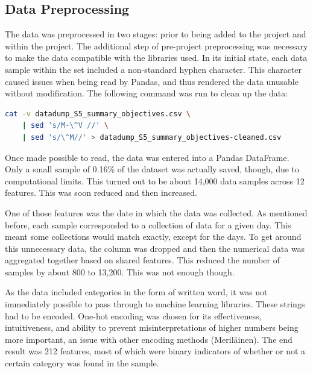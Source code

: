 \documentclass[12pt]{article}
\begin{document}
\newpage

\subsection{Data Preprocessing}
The data was preprocessed in two stages: prior to being added to the project and within the project.
The additional step of pre-project preprocessing was necessary to make the data compatible with the libraries used.
In its initial state, each data sample within the set included a non-standard hyphen character.
This character caused issues when being read by Pandas, and thus rendered the data unusable without modification.
The following command was run to clean up the data:
\begin{lstlisting}[language=Bash]
	cat -v datadump_S5_summary_objectives.csv \
	| sed 's/M-\^V //' \
	| sed 's/\^M//' > datadump_S5_summary_objectives-cleaned.csv
\end{lstlisting}

Once made possible to read, the data was entered into a Pandas DataFrame.
Only a small sample of 0.16\% of the dataset was actually saved, though, due to computational limits.
This turned out to be about 14,000 data samples across 12 features.
This was soon reduced and then increased.

One of those features was the date in which the data was collected.
As mentioned before, each sample corresponded to a collection of data for a given day.
This meant some collections would match exactly, except for the days.
To get around this unnecessary data, the column was dropped and then the numerical data was aggregated together based on shared features.
This reduced the number of samples by about 800 to 13,200.
This was not enough though.

As the data included categories in the form of written word, it was not immediately possible to pass through to machine learning libraries.
These strings had to be encoded.
One-hot encoding was chosen for its effectiveness, intuitiveness, and ability to prevent misinterpretations of higher numbers being more important, an issue with other encoding methods (Meriläinen).
The end result was 212 features, most of which were binary indicators of whether or not a certain category was found in the sample.

\newpage


\end{document}
